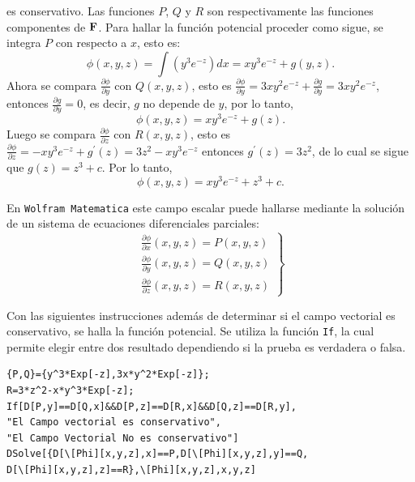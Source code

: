 \begin{ejemplo}
es conservativo. Las funciones $P$, $Q$ y $R$ son respectivamente las funciones componentes de ${\bf F}$.
Para hallar la función potencial  proceder como sigue,
se integra $P$ con respecto a $x$, esto es:
$$\phi (x,y,z) = \int \left( y^{3}e^{-z}\right)
dx= xy^{3}e^{-z}+g\left( y,z\right).$$
Ahora se compara $\frac{\partial \phi }{\partial y}$ con $Q\left(x,y,z\right) $, esto es
$\frac{\partial \phi }{\partial y}= 3xy^{2}e^{-z}+\frac{\partial g}{\partial y}=3xy^{2}e^{-z}$, entonces
$\frac{\partial g}{\partial y}=0$, es decir, $g$ no depende de $y$, por lo tanto,
\[\phi (x,y,z) = xy^{3}e^{-z}+g\left(z\right).\]
Luego se compara $\frac{\partial \phi }{\partial z}$ con
$R(x,y,z)$, esto es $\frac{\partial \phi }{\partial z}= -xy^{3}e^{-z}+g^{\prime}(z) = 3z^{2}-xy^{3}e^{-z}$
entonces $g^{\prime}\left( z\right) =3z^{2}$, de lo cual se sigue que $g\left( z\right) =z^{3}+c$. Por lo tanto,
\[\phi (x,y,z) = xy^{3}e^{-z}+z^{3}+c.\]
\end{ejemplo}

En \verb"Wolfram Matematica" este campo escalar puede hallarse mediante la solución de
un sistema de ecuaciones diferenciales parciales:
$$\left.
\begin{array}{c}
\frac{\partial \phi }{\partial x}(x,y,z)=P(x,y,z) \\[0.15cm]
\frac{\partial \phi }{\partial y}(x,y,z) =Q(x,y,z) \\[0.15cm]
\frac{\partial \phi }{\partial z}(x,y,z) =R(x,y,z)
\end{array}%
\right\} $$

Con las siguientes instrucciones además de determinar si el campo vectorial es conservativo, se halla la función potencial.
Se utiliza la función \verb"If", la cual permite elegir entre dos resultado dependiendo si la prueba es verdadera o falsa. 

\begin{tcolorbox}[title=Instrucciones en Mathematica]
\begin{Verbatim}[formatcom=\letraverbatim]
{P,Q}={y^3*Exp[-z],3x*y^2*Exp[-z]};
R=3*z^2-x*y^3*Exp[-z];
If[D[P,y]==D[Q,x]&&D[P,z]==D[R,x]&&D[Q,z]==D[R,y],
"El Campo vectorial es conservativo",
"El Campo Vectorial No es conservativo"]
DSolve[{D[\[Phi][x,y,z],x]==P,D[\[Phi][x,y,z],y]==Q,
D[\[Phi][x,y,z],z]==R},\[Phi][x,y,z],x,y,z]
\end{Verbatim}
\end{tcolorbox}
\newpage